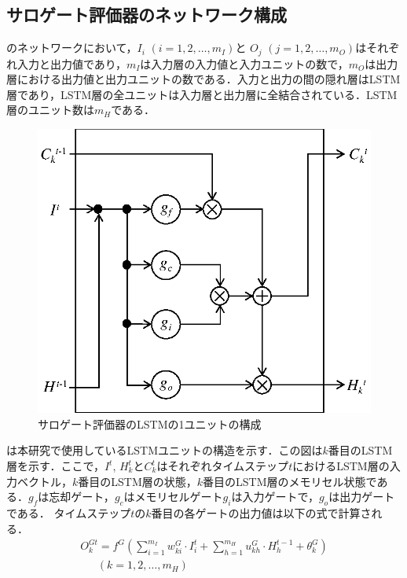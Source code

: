\subsection{サロゲート評価器のネットワーク構成}
のネットワークにおいて，$I_i$ $(i=1, 2,\dotsc,m_{I})$と $O_j$ $(j=1, 2,\dotsc,m_{O})$はそれぞれ入力と出力値であり，$m_{I}$は入力層の入力値と入力ユニットの数で，$m_{O}$は出力層における出力値と出力ユニットの数である．入力と出力の間の隠れ層はLSTM層であり，LSTM層の全ユニットは入力層と出力層に全結合されている．LSTM層のユニット数は$m_{H}$である．

\begin{figure}[t]
  \begin{center}
    \includegraphics[width=0.5\linewidth]{fig/surrogate_lstm.eps}
  \end{center}
  \caption{サロゲート評価器のLSTMの1ユニットの構成}
  \label{fig::surrogate_lstm}
\end{figure}

は本研究で使用しているLSTMユニットの構造を示す\cite{Gers00}．この図は$k$番目のLSTM層を示す．ここで，$I^t$, $H_k^t$と$C_k^t$はそれぞれタイムステップ$t$におけるLSTM層の入力ベクトル，$k$番目のLSTM層の状態，$k$番目のLSTM層のメモリセル状態である．$g_f$は忘却ゲート，$g_c$はメモリセルゲート$g_{i}$は入力ゲートで，$g_{o}$は出力ゲートである．
タイムステップ$t$の$k$番目の各ゲートの出力値は以下の式で計算される．
\begin{align}
  O^{Gt}_k = f^G \left( \sum^{m_I}_{i = 1}{w^G_{ki} \cdot I^t_i} + \sum^{m_H}_{h = 1}{u^G_{kh} \cdot H^{t-1}_h} + \theta^G_k \right) \nonumber \\~~~~~~~(k=1,2,\dots,m_H)
\end{align}

